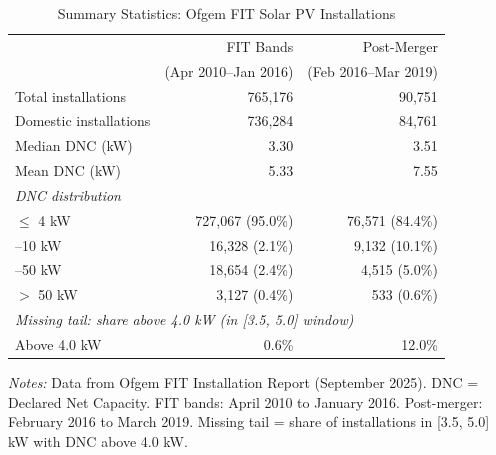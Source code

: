 \begin{table}[t]
\centering
\caption{Summary Statistics: Ofgem FIT Solar PV Installations}
\label{tab:summary}
\begin{tabular}{lrr}
\toprule
 & FIT Bands & Post-Merger \\
 & (Apr 2010--Jan 2016) & (Feb 2016--Mar 2019) \\
\midrule
Total installations & 765,176 & 90,751 \\
Domestic installations & 736,284 & 84,761 \\
Median DNC (kW) & 3.30 & 3.51 \\
Mean DNC (kW) & 5.33 & 7.55 \\
\midrule
\multicolumn{3}{l}{\textit{DNC distribution}} \\
\quad $\leq$ 4 kW & 727,067 (95.0\%) & 76,571 (84.4\%) \\
\quad 4--10 kW & 16,328 (2.1\%) & 9,132 (10.1\%) \\
\quad 10--50 kW & 18,654 (2.4\%) & 4,515 (5.0\%) \\
\quad $>$ 50 kW & 3,127 (0.4\%) & 533 (0.6\%) \\
\midrule
\multicolumn{3}{l}{\textit{Missing tail: share above 4.0 kW (in [3.5, 5.0] window)}} \\
\quad Above 4.0 kW & 0.6\% & 12.0\% \\
\bottomrule
\end{tabular}

\begin{flushleft}\small \textit{Notes:} Data from Ofgem FIT Installation Report (September 2025). DNC = Declared Net Capacity. FIT bands: April 2010 to January 2016. Post-merger: February 2016 to March 2019. Missing tail = share of installations in [3.5, 5.0] kW with DNC above 4.0 kW.\end{flushleft}
\end{table}
